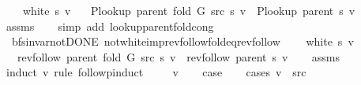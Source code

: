 \begin{isabellebody}
\ \ \ {\isachardoublequoteopen}{\isasymnot}\ white\ s\ v{\isachardoublequoteclose}\isanewline
\ \ \ {\isachardoublequoteopen}P{\isacharunderscore}{\kern0pt}lookup\ {\isacharparenleft}{\kern0pt}parent\ {\isacharparenleft}{\kern0pt}fold\ G\ src\ s{\isacharparenright}{\kern0pt}{\isacharparenright}{\kern0pt}\ v\ {\isacharequal}{\kern0pt}\ P{\isacharunderscore}{\kern0pt}lookup\ {\isacharparenleft}{\kern0pt}parent\ s{\isacharparenright}{\kern0pt}\ v{\isachardoublequoteclose}\isanewline
%
\isadelimproof
\ \ %
\endisadelimproof
%
\isatagproof
{}\isamarkupfalse%
\ assms\isanewline
\ \ \isamarkupfalse%
\ {\isacharparenleft}{\kern0pt}simp\ add{\isacharcolon}{\kern0pt}\ lookup{\isacharunderscore}{\kern0pt}parent{\isacharunderscore}{\kern0pt}fold{\isacharunderscore}{\kern0pt}cong{\isacharparenright}{\kern0pt}%
\endisatagproof
{\isafoldproof}%
%
\isadelimproof
\isanewline
%
\endisadelimproof
\isanewline
{}\isamarkupfalse%
\ {\isacharparenleft}{\kern0pt}\ bfs{\isacharunderscore}{\kern0pt}invar{\isacharunderscore}{\kern0pt}not{\isacharunderscore}{\kern0pt}DONE{\isacharparenright}{\kern0pt}\ not{\isacharunderscore}{\kern0pt}white{\isacharunderscore}{\kern0pt}imp{\isacharunderscore}{\kern0pt}rev{\isacharunderscore}{\kern0pt}follow{\isacharunderscore}{\kern0pt}fold{\isacharunderscore}{\kern0pt}eq{\isacharunderscore}{\kern0pt}rev{\isacharunderscore}{\kern0pt}follow{\isacharcolon}{\kern0pt}\isanewline
\ \ \ {\isachardoublequoteopen}{\isasymnot}\ white\ s\ v{\isachardoublequoteclose}\isanewline
\ \ \ {\isachardoublequoteopen}rev{\isacharunderscore}{\kern0pt}follow\ {\isacharparenleft}{\kern0pt}parent\ {\isacharparenleft}{\kern0pt}fold\ G\ src\ s{\isacharparenright}{\kern0pt}{\isacharparenright}{\kern0pt}\ v\ {\isacharequal}{\kern0pt}\ rev{\isacharunderscore}{\kern0pt}follow\ {\isacharparenleft}{\kern0pt}parent\ s{\isacharparenright}{\kern0pt}\ v{\isachardoublequoteclose}\isanewline
%
\isadelimproof
\ \ %
\endisadelimproof
%
\isatagproof
{}\isamarkupfalse%
\ assms\isanewline
{}\isamarkupfalse%
\ {\isacharparenleft}{\kern0pt}induct\ v\ rule{\isacharcolon}{\kern0pt}\ follow{\isacharunderscore}{\kern0pt}pinduct{\isacharparenright}{\kern0pt}\isanewline
\ \ \isamarkupfalse%
\ {\isacharparenleft}{\kern0pt}{}\ v{\isacharparenright}{\kern0pt}\isanewline
\ \ \isamarkupfalse%
\ {\isacharquery}{\kern0pt}case\isanewline
\ \ \isamarkupfalse%
\ {\isacharparenleft}{\kern0pt}cases\ {\isachardoublequoteopen}v\ {\isacharequal}{\kern0pt}\ src{\isachardoublequoteclose}{\isacharparenright}{\kern0pt}\isanewline

\end{isabellebody}
